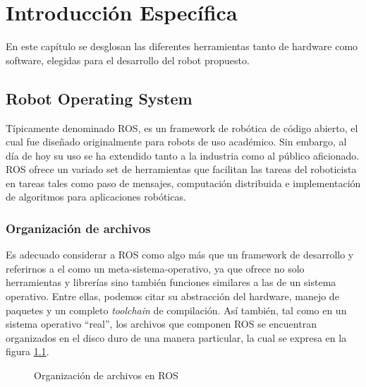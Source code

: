 \chapter{Introducción Específica}

\label{Capitulo2}

En este capítulo se desglosan las diferentes herramientas tanto de hardware como software, elegidas para el desarrollo del robot propuesto.

\section{Robot Operating System}

Típicamente denominado ROS, es un framework de robótica de código abierto, el cual fue diseñado originalmente para robots de uso académico. Sin embargo, al día de hoy su uso se ha extendido tanto a la industria como al público aficionado.\newline
ROS ofrece un variado set de herramientas que facilitan las tareas del roboticista en tareas tales como paso de mensajes, computación distribuida e implementación de algoritmos para aplicaciones robóticas.

\subsection{Organización de archivos}

Es adecuado considerar a ROS como algo más que un framework de desarrollo y referirnos a el como un meta-sistema-operativo, ya que ofrece no solo herramientas y librerías sino también funciones similares a las de un sistema operativo. Entre ellas, podemos citar su abstracción del hardware, manejo de paquetes y un completo \textit{toolchain} de compilación. Así también, tal como en un sistema operativo ``real'', los archivos que componen ROS se encuentran organizados en el disco duro de una manera particular, la cual se expresa en la figura \ref{fig:rosSistemaDeArchivos}.

\begin{figure}[ht]
    \centering
    \def\svgwidth{350pt}
    
    \caption{Organización de archivos en ROS}
    \label{fig:rosSistemaDeArchivos}
\end{figure}

